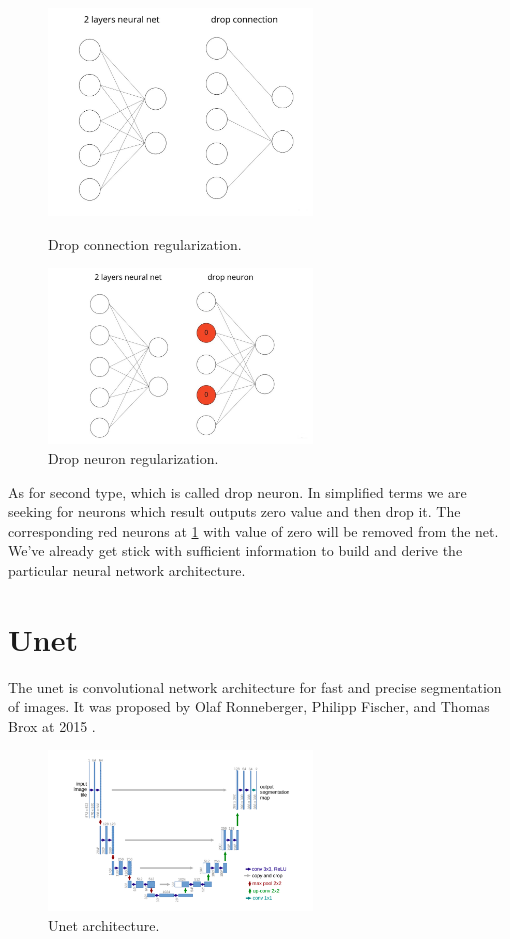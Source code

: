 \begin{figure}[H]
\centering
\begin{minipage}{.48\linewidth}
    \includegraphics[width=7cm]{images/drop_connection.jpg}
    \caption {Drop connection regularization.}
    \label{fig:drop_connection}
\end{minipage}
\hfill
\begin{minipage}{.48\linewidth}
    \includegraphics[width=7cm]{images/drop_neuron.jpg}
    \caption {Drop neuron regularization.}
    \label{fig:drop_neuron}
\end{minipage}
\end{figure}

As for second type, which is called drop neuron. In simplified terms we are seeking for neurons which result outputs zero value and then drop it. The corresponding red neurons at \ref{fig:drop_neuron} with value of zero will be removed from the net. We've already get stick with sufficient information to build and derive the particular neural network architecture. 

\section{Unet}
The unet is convolutional network architecture for fast and precise segmentation of images. It was proposed by Olaf Ronneberger, Philipp Fischer, and Thomas Brox at 2015 \cite{Ronneberger2015}. 
\begin{figure}[h]
    \centering \includegraphics[width=7cm]{images/unet.png}
    \caption {Unet architecture.}
\end{figure}

